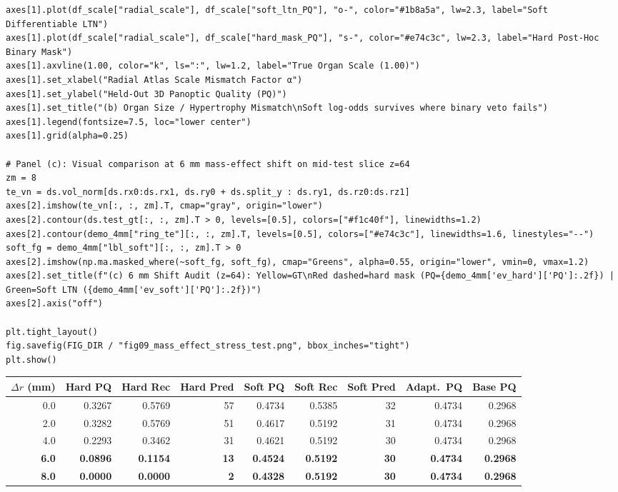 \documentclass[10pt,a4paper]{article}
\renewcommand{\_}{\origunderscore\allowbreak}
\begin{document}
\begin{codebox}
\begin{lstlisting}[style=pybmed]
axes[1].plot(df_scale["radial_scale"], df_scale["soft_ltn_PQ"], "o-", color="#1b8a5a", lw=2.3, label="Soft Differentiable LTN")
axes[1].plot(df_scale["radial_scale"], df_scale["hard_mask_PQ"], "s-", color="#e74c3c", lw=2.3, label="Hard Post-Hoc Binary Mask")
axes[1].axvline(1.00, color="k", ls=":", lw=1.2, label="True Organ Scale (1.00)")
axes[1].set_xlabel("Radial Atlas Scale Mismatch Factor α")
axes[1].set_ylabel("Held-Out 3D Panoptic Quality (PQ)")
axes[1].set_title("(b) Organ Size / Hypertrophy Mismatch\nSoft log-odds survives where binary veto fails")
axes[1].legend(fontsize=7.5, loc="lower center")
axes[1].grid(alpha=0.25)

# Panel (c): Visual comparison at 6 mm mass-effect shift on mid-test slice z=64
zm = 8
te_vn = ds.vol_norm[ds.rx0:ds.rx1, ds.ry0 + ds.split_y : ds.ry1, ds.rz0:ds.rz1]
axes[2].imshow(te_vn[:, :, zm].T, cmap="gray", origin="lower")
axes[2].contour(ds.test_gt[:, :, zm].T > 0, levels=[0.5], colors=["#f1c40f"], linewidths=1.2)
axes[2].contour(demo_4mm["ring_te"][:, :, zm].T, levels=[0.5], colors=["#e74c3c"], linewidths=1.6, linestyles="--")
soft_fg = demo_4mm["lbl_soft"][:, :, zm].T > 0
axes[2].imshow(np.ma.masked_where(~soft_fg, soft_fg), cmap="Greens", alpha=0.55, origin="lower", vmin=0, vmax=1.2)
axes[2].set_title(f"(c) 6 mm Shift Audit (z=64): Yellow=GT\nRed dashed=hard mask (PQ={demo_4mm['ev_hard']['PQ']:.2f}) | Green=Soft LTN ({demo_4mm['ev_soft']['PQ']:.2f})")
axes[2].axis("off")

plt.tight_layout()
fig.savefig(FIG_DIR / "fig09_mass_effect_stress_test.png", bbox_inches="tight")
plt.show()
\end{lstlisting}
\end{codebox}
\begin{outbox}
\centering
{\scriptsize
\setlength{\tabcolsep}{3.6pt}
\renewcommand{\arraystretch}{1.18}
\begin{tabular}{r r r r r r r r r}
\toprule
\rowcolor{uibblue!12}\textbf{$\Delta r$ (mm)} & \textbf{Hard PQ} & \textbf{Hard Rec} & \textbf{Hard Pred} & \textbf{Soft PQ} & \textbf{Soft Rec} & \textbf{Soft Pred} & \textbf{Adapt.\ PQ} & \textbf{Base PQ} \\
\midrule
0.0 & 0.3267 & 0.5769 & 57 & 0.4734 & 0.5385 & 32 & 0.4734 & 0.2968 \\
2.0 & 0.3282 & 0.5769 & 51 & 0.4617 & 0.5192 & 31 & 0.4734 & 0.2968 \\
4.0 & 0.2293 & 0.3462 & 31 & 0.4621 & 0.5192 & 30 & 0.4734 & 0.2968 \\
\textbf{6.0} & \textbf{0.0896} & \textbf{0.1154} & \textbf{13} & \textbf{0.4524} & \textbf{0.5192} & \textbf{30} & \textbf{0.4734} & \textbf{0.2968} \\
\textbf{8.0} & \textbf{0.0000} & \textbf{0.0000} & \textbf{2} & \textbf{0.4328} & \textbf{0.5192} & \textbf{30} & \textbf{0.4734} & \textbf{0.2968} \\
\bottomrule
\end{tabular}
}
\end{outbox}
\end{document}
